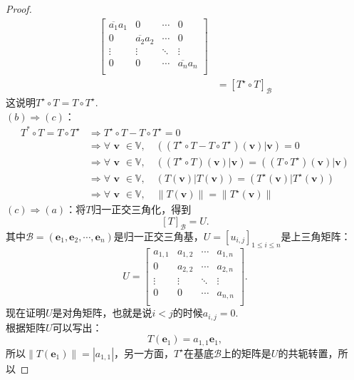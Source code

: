 \documentclass[12pt,UTF8,fontset=none]{ctexbook}
\begin{document}
\begin{proof}
\begin{align*}
\begin{bmatrix}
            \overline{a_1}a_1 & 0 & \cdots & 0 \\
            0 & \overline{a_2}a_2 & \cdots & 0 \\
            \vdots & \vdots & \ddots & \vdots \\
            0 & 0 & \cdots & \overline{a_n}a_n \\
        \end{bmatrix}  \\
        &= [T^\star\circ T]_{\mathcal{B}} 
    \end{align*}
    这说明$T^\star\circ T = T\circ T^\star.$\\
    $(b)\Rightarrow (c)$：
    \begin{align*}
        T^*\circ T = T\circ T^\star &\Rightarrow T^\star\circ T - T\circ T^\star = 0  \\
        &\Rightarrow \forall \,\, \mathbf{v} \,\, \in\mathbb{V}, \quad ((T^\star\circ T - T\circ T^\star)(\mathbf{v})|\mathbf{v}) = 0  \\
        &\Rightarrow \forall \,\, \mathbf{v} \,\, \in\mathbb{V}, \quad ((T^\star\circ T)(\mathbf{v})|\mathbf{v}) = ((T\circ T^\star)(\mathbf{v})|\mathbf{v})  \\
        &\Rightarrow \forall \,\, \mathbf{v} \,\, \in\mathbb{V}, \quad (T(\mathbf{v})|T(\mathbf{v})) = (T^\star(\mathbf{v})|T^\star(\mathbf{v}))  \\
        &\Rightarrow \forall \,\, \mathbf{v} \,\, \in\mathbb{V}, \quad \|T(\mathbf{v})\| = \|T^\star(\mathbf{v})\|  
    \end{align*}
    $(c)\Rightarrow (a)$：将$T$归一正交三角化，得到
    $$ [T]_{\mathcal{B}} = U.$$
    其中${\mathcal{B}} = (\mathbf{e}_1, \mathbf{e}_2, \cdots , \mathbf{e}_n)$是归一正交三角基，$U = [u_{i,j}]_{1\leqslant i \leqslant n}$是上三角矩阵：
    $$U = \begin{bmatrix}
        a_{1,1} & a_{1,2} & \cdots & a_{1,n} \\
        0 & a_{2,2} & \cdots & a_{2,n} \\
        \vdots & \vdots & \ddots & \vdots \\
        0 & 0 & \cdots & a_{n,n} \\
    \end{bmatrix}.
    $$ 
    现在证明$U$是对角矩阵，也就是说$i<j$的时候$a_{i,j} = 0$.\\
    根据矩阵$U$可以写出：
    $$ T(\mathbf{e}_1) = a_{1,1} \mathbf{e}_1,$$
    所以$\| T(\mathbf{e}_1)\| = |a_{1,1}|$，另一方面，$T^\star$在基底${\mathcal{B}}$上的矩阵是$U$的共轭转置，所以

\end{proof}
\end{document}
